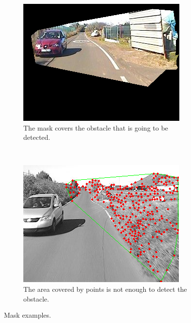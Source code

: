 \begin{figure}[t]
        \centering
        \begin{subfigure}[b]{0.45\textwidth}
                \centering
                \includegraphics[width=\textwidth]{maskCovers2}
                \caption{The mask covers the obstacle that is going to be detected.}\label{fig:cp01_mask_is_covering}
        \end{subfigure}%
        ~ %
        \begin{subfigure}[b]{0.45\textwidth}
                \centering
                \includegraphics[width=\textwidth]{maskNotCovers}
                \caption{The area covered by points is not enough to detect the obstacle.}\label{fig:cp01_mask_not_covers}
        \end{subfigure}%
        \caption{Mask examples.}\label{fig:cp01_mask_examples}
\end{figure}

